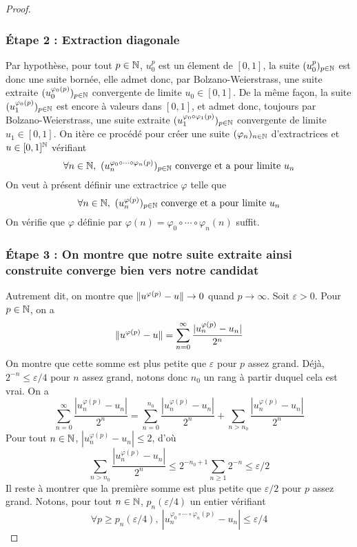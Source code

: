 \documentclass[10pt]{scrartcl}
\begin{document}
\begin{proof}
        \subsubsection*{Étape 2 : Extraction diagonale} 
        Par hypothèse, pour tout $p\in\operatorname{\mathbb N}$, $u_0^p$ est un élement de $[0,1]$, la suite $(u_0^p)_{p\in\operatorname{\mathbb N}}$ est donc une suite bornée, elle admet donc, par Bolzano-Weierstrass, une suite extraite $(u_0^{\varphi_0(p)})_{p\in\operatorname{\mathbb N}}$ convergente de limite $u_0\in[0,1]$.
        De la même façon, la suite $(u_1^{\varphi_0(p)})_{p\in\operatorname{\mathbb N}}$ est encore à valeurs dans $[0,1]$, et admet donc, toujours par Bolzano-Weierstrass, une suite extraite $(u_1^{\varphi_0\circ\varphi_1(p)})_{p\in\operatorname{\mathbb N}}$ convergente de limite $u_1\in[0,1]$. 
        On itère ce procédé pour créer une suite $(\varphi_n)_{n\in\operatorname{\mathbb N}}$ d'extractrices et $u\in[0,1]^{\operatorname{\mathbb N}}$ vérifiant 
        \[
            \forall n\in\N,\ (u_n^{\varphi_0\circ\cdots\circ\varphi_n(p)})_{p\in\N}\text{ converge et a pour limite }u_n
        \]
        On veut à présent définir une extractrice $\varphi$ telle que 
        \[
            \forall n\in\N,\ (u_n^{\varphi(p)})_{p\in\N}\text{ converge et a pour limite }u_n
        \]
        On vérifie que $\varphi$ définie par $\varphi(n)=\varphi_0\circ\cdots\circ\varphi_n(n)$ suffit.

        \subsubsection*{Étape 3 : On montre que notre suite extraite ainsi construite converge bien vers notre candidat}
        Autrement dit, on montre que $\lVert u^{\varphi(p)}-u\rVert\to 0$ quand $p\to\infty$. Soit $\varepsilon >0$. Pour $p\in\operatorname{\mathbb N}$, on a 
        \[
            \lVert u^{\varphi(p)}-u\rVert=\sum_{n=0}^\infty\frac{|u^{\varphi(p)}_n-u_n|}{2^n}
        \]
        On montre que cette somme est plus petite que $\varepsilon$ pour $p$ assez grand. 
        Déjà, $2^{-n}\leq \varepsilon/4$ pour $n$ assez grand, notons donc $n_0$ un rang à partir duquel cela est vrai. On a 
        \[
            \sum_{n=0}^\infty\frac{|u^{\varphi(p)}_n-u_n|}{2^n}=\sum_{n=0}^{n_0}\frac{|u^{\varphi(p)}_n-u_n|}{2^n}+\sum_{n>n_0}\frac{|u^{\varphi(p)}_n-u_n|}{2^n}
        \]
        Pour tout $n\in\operatorname{\mathbb N}$, $|u^{\varphi(p)}_n-u_n|\leq 2$, d'où 
        \[
            \sum_{n>n_0}\frac{|u^{\varphi(p)}_n-u_n|}{2^n}\leq 2^{-n_0+1}\sum_{n\geq 1}2^{-n}\leq\varepsilon/2
        \]
        Il reste à montrer que la première somme est plus petite que $\varepsilon/2$ pour $p$ assez grand. 
        Notons, pour tout $n\in\operatorname{\mathbb N}$, $p_n(\varepsilon/4)$ un entier vérifiant
        \[
            \forall p\geq p_n(\varepsilon/4),\ |u^{\varphi_0\circ\cdots\circ\varphi_n(p)}_n-u_n|\leq\varepsilon/4
        \]


\end{proof}
\end{document}

